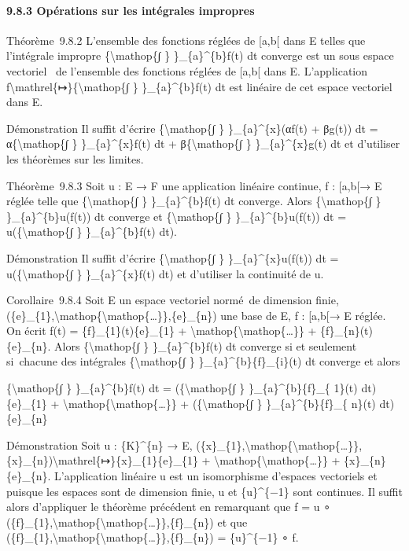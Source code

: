 \documentclass[]{article}
\begin{document}
\paragraph{9.8.3 Opérations sur les intégrales impropres}

Théorème~9.8.2 L'ensemble des fonctions réglées de {[}a,b{[} dans E
telles que l'intégrale impropre \{\textbackslash{}mathop\{∫ \}
\}\_\{a\}\^{}\{b\}f(t) dt converge est un sous espace vectoriel ~de
l'ensemble des fonctions réglées de {[}a,b{[} dans E. L'application
f\textbackslash{}mathrel\{↦\}\{\textbackslash{}mathop\{∫ \}
\}\_\{a\}\^{}\{b\}f(t) dt est linéaire de cet espace vectoriel dans E.

Démonstration Il suffit d'écrire \{\textbackslash{}mathop\{∫ \}
\}\_\{a\}\^{}\{x\}(αf(t) + βg(t)) dt = α\{\textbackslash{}mathop\{∫ \}
\}\_\{a\}\^{}\{x\}f(t) dt + β\{\textbackslash{}mathop\{∫ \}
\}\_\{a\}\^{}\{x\}g(t) dt et d'utiliser les théorèmes sur les limites.

Théorème~9.8.3 Soit u : E → F une application linéaire continue, f :
{[}a,b{[}→ E réglée telle que \{\textbackslash{}mathop\{∫ \}
\}\_\{a\}\^{}\{b\}f(t) dt converge. Alors \{\textbackslash{}mathop\{∫ \}
\}\_\{a\}\^{}\{b\}u(f(t)) dt converge et \{\textbackslash{}mathop\{∫ \}
\}\_\{a\}\^{}\{b\}u(f(t)) dt = u(\{\textbackslash{}mathop\{∫ \}
\}\_\{a\}\^{}\{b\}f(t) dt).

Démonstration Il suffit d'écrire \{\textbackslash{}mathop\{∫ \}
\}\_\{a\}\^{}\{x\}u(f(t)) dt = u(\{\textbackslash{}mathop\{∫ \}
\}\_\{a\}\^{}\{x\}f(t) dt) et d'utiliser la continuité de u.

Corollaire~9.8.4 Soit E un espace vectoriel normé~de dimension finie,
(\{e\}\_\{1\},\textbackslash{}mathop\{\textbackslash{}mathop\{\ldots{}\}\},\{e\}\_\{n\})
une base de E, f : {[}a,b{[}→ E réglée. On écrit f(t) =
\{f\}\_\{1\}(t)\{e\}\_\{1\} +
\textbackslash{}mathop\{\textbackslash{}mathop\{\ldots{}\}\} +
\{f\}\_\{n\}(t)\{e\}\_\{n\}. Alors \{\textbackslash{}mathop\{∫ \}
\}\_\{a\}\^{}\{b\}f(t) dt converge si et seulement si~chacune des
intégrales \{\textbackslash{}mathop\{∫ \}
\}\_\{a\}\^{}\{b\}\{f\}\_\{i\}(t) dt converge et alors

\{\textbackslash{}mathop\{∫ \} \}\_\{a\}\^{}\{b\}f(t) dt =
(\{\textbackslash{}mathop\{∫ \} \}\_\{a\}\^{}\{b\}\{f\}\_\{ 1\}(t)
dt)\{e\}\_\{1\} +
\textbackslash{}mathop\{\textbackslash{}mathop\{\ldots{}\}\} +
(\{\textbackslash{}mathop\{∫ \} \}\_\{a\}\^{}\{b\}\{f\}\_\{ n\}(t)
dt)\{e\}\_\{n\}

Démonstration Soit u : \{K\}\^{}\{n\} → E,
(\{x\}\_\{1\},\textbackslash{}mathop\{\textbackslash{}mathop\{\ldots{}\}\},\{x\}\_\{n\})\textbackslash{}mathrel\{↦\}\{x\}\_\{1\}\{e\}\_\{1\}
+ \textbackslash{}mathop\{\textbackslash{}mathop\{\ldots{}\}\} +
\{x\}\_\{n\}\{e\}\_\{n\}. L'application linéaire u est un isomorphisme
d'espaces vectoriels et puisque les espaces sont de dimension finie, u
et \{u\}\^{}\{−1\} sont continues. Il suffit alors d'appliquer le
théorème précédent en remarquant que f = u ∘
(\{f\}\_\{1\},\textbackslash{}mathop\{\textbackslash{}mathop\{\ldots{}\}\},\{f\}\_\{n\})
et que
(\{f\}\_\{1\},\textbackslash{}mathop\{\textbackslash{}mathop\{\ldots{}\}\},\{f\}\_\{n\})
= \{u\}\^{}\{−1\} ∘ f.
\end{document}
